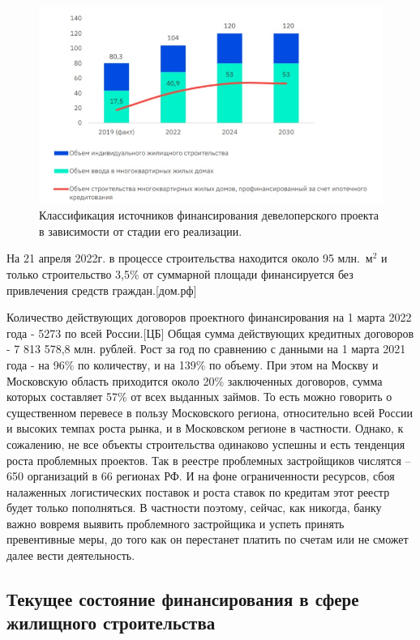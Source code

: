 \documentclass[12pt,a4paper]{article} %
\begin{document}
\begin{figure}[h]
	
	\centering
	
	\includegraphics[width=0.7\linewidth]{develop_dynam.jpg}
	
	\caption{Классификация источников финансирования девелоперского проекта в зависимости от стадии его реализации.}
	
	\label{fig:develop_dynam}
	
\end{figure}

На 21 апреля 2022г. в процессе строительства находится около 95 млн.~$\text{м}^2$ и только строительство 3,5\% от суммарной площади финансируется без привлечения средств граждан.[дом.рф]
 
Количество действующих договоров проектного финансирования на 1 марта 2022 года - 5273 по всей России.[ЦБ] Общая сумма действующих кредитных договоров - 7 813 578,8 млн. рублей.
Рост за год по сравнению с данными на 1 марта 2021 года - на 96\% по количеству, и на 139\% по объему.
При этом на Москву и Московскую область приходится около 20\% заключенных договоров, сумма которых составляет 57\% от всех выданных займов. То есть можно говорить о существенном перевесе в пользу Московского региона, относительно всей России и высоких темпах роста рынка, и в Московском регионе в частности. Однако, к сожалению, не все объекты строительства одинаково успешны и есть тенденция роста проблемных проектов. Так в реестре проблемных застройщиков числятся – 650 организаций в 66 регионах РФ. И на фоне ограниченности ресурсов, сбоя налаженных логистических поставок и роста ставок по кредитам этот реестр будет только пополняться. В частности поэтому, сейчас, как никогда, банку важно вовремя выявить проблемного застройщика и успеть принять превентивные меры, до того как он перестанет платить по счетам или не сможет далее вести деятельность.  

\subsection{Текущее состояние финансирования в сфере жилищного строительства}
\end{document}
